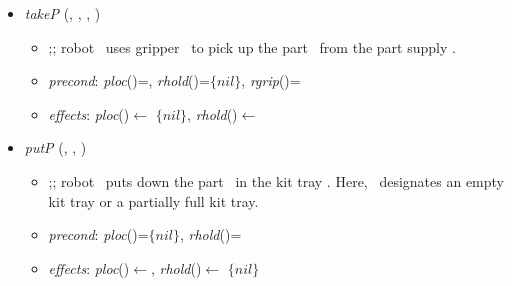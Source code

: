 \begin{itemize}
\item \textit{takeP} (\robot, \parts, \partsup, \grip)
\begin{itemize}
\item ;; robot \robot\ uses gripper \grip\ to pick up the part \parts\ from the part supply \partsup.
\item \textit{precond}: \textit{ploc}(\parts)=\partsup, \textit{rhold}(\robot)=$\lbrace nil\rbrace$, \textit{rgrip}(\robot)=\grip
\item \textit{effects}: \textit{ploc}(\parts)$\leftarrow$ $\lbrace nil\rbrace$, \textit{rhold}(\robot)$\leftarrow$\parts
\end{itemize}

\item \textit{putP} (\robot, \parts, \kt)
\begin{itemize}
\item ;; robot \robot\ puts down the part \parts\ in the kit tray \kt. Here, \kt\ designates an empty kit tray or a partially full kit tray.
\item \textit{precond}: \textit{ploc}(\parts)=$\lbrace nil\rbrace$, \textit{rhold}(\robot)=\parts
\item \textit{effects}: \textit{ploc}(\parts)$\leftarrow$\kt, \textit{rhold}(\robot)$\leftarrow$ $\lbrace nil\rbrace$
\end{itemize}

\begin{comment}
\item \textit{moveAboveP} (\robot=robot, \parts=part, {\constant{pos1}}, {\constant{pos2}})
\begin{itemize}
\item ;; robot \robot\ moves above the part \parts\ which is in the part supply. The previous position of the robot is \constant{pos1} and the new position is \constant{pos2}.
\item \textit{precond}: \textit{rpos}(\robot)={\constant{pos1}}
\item \textit{effects}: \textit{rpos}(\robot)$\leftarrow${\constant{pos2}}, \textit{rabove}(\robot)$\leftarrow$\parts
\end{itemize}

\item \textit{moveAboveK} (\robot, \kt, {\constant{pos1}}, {\constant{pos2}})
\begin{itemize}
\item ;; robot \robot\ moves above the kit tray \kt, i.e., from position \constant{pos1} to position \constant{pos2}. Here, the kit tray \kt\ can be an empty kit tray \ekt, a partially full kit tray \pfkt, or a finished kit tray \fkt.
\item \textit{precond}: \textit{rpos}(\robot)={\constant{pos1}}
\item \textit{effects}: \textit{rpos}(\robot)$\leftarrow${\constant{pos2}}, \textit{rabove}(\robot)$\leftarrow$\kt
\end{itemize}


\end{comment}
\end{itemize}
